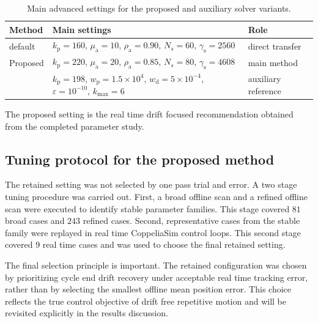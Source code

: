 \begin{table}[H]
  \centering
  \caption{Main advanced settings for the proposed and auxiliary solver variants.}
  \label{tab:advanced_parameters}
  \begin{threeparttable}
    \begin{tabular}{p{3.0cm}p{8.3cm}p{2.4cm}}
      \toprule
      Method & Main settings & Role \\
      \midrule
      \methodtwoDL{} default &
      $k_{\mathrm{p}}=160$, $\mu_{\mathrm{a}}=10$, $\rho_{\mathrm{a}}=0.90$, $N_s=60$, $\gamma_{\mathrm{s}}=2560$ &
      direct transfer \\
      Proposed \methodtwoDL{} &
      $k_{\mathrm{p}}=220$, $\mu_{\mathrm{a}}=20$, $\rho_{\mathrm{a}}=0.85$, $N_s=80$, $\gamma_{\mathrm{s}}=4608$ &
      main method \\
      \methodthreepcg{} &
      $k_{\mathrm{p}}=198$, $w_{\mathrm{p}}=1.5\times10^{4}$, $w_{\mathrm{d}}=5\times10^{-4}$, $\varepsilon=10^{-10}$, $k_{\max}=6$ &
      auxiliary reference \\
      \bottomrule
    \end{tabular}
    \begin{tablenotes}[flushleft]
      \item The proposed \methodtwoDL{} setting is the real time drift focused recommendation obtained from the completed parameter study.
    \end{tablenotes}
  \end{threeparttable}
\end{table}

\subsection{Tuning protocol for the proposed method}

The retained \methodtwoDL{} setting was not selected by one pass trial and error. A two stage tuning procedure was carried out. First, a broad offline scan and a refined offline scan were executed to identify stable parameter families. This stage covered $81$ broad cases and $243$ refined cases. Second, representative cases from the stable family were replayed in real time CoppeliaSim control loops. This second stage covered $9$ real time cases and was used to choose the final retained setting.

The final selection principle is important. The retained configuration was chosen by prioritizing cycle end drift recovery under acceptable real time tracking error, rather than by selecting the smallest offline mean position error. This choice reflects the true control objective of drift free repetitive motion and will be revisited explicitly in the results discussion.

